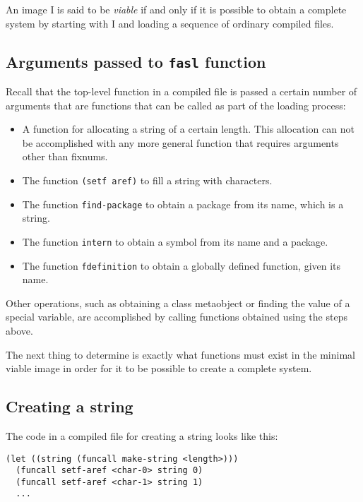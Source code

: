 An image I is said to be \emph{viable} if and only if it is possible
to obtain a complete \commonlisp{} system by starting with I and loading a
sequence of ordinary compiled files.

\subsection{Arguments passed to \texttt{fasl} function}
\label{sec-bootstrapping-arguments-to-fasl-function}

Recall that the top-level function in a compiled file is passed a
certain number of arguments that are functions that can be called as
part of the loading process:

\begin{itemize}
\item A function for allocating a string of a certain length.  This
  allocation can not be accomplished with any more general function
  that requires arguments other than fixnums.
\item The function \texttt{(setf aref)} to fill a string with
  characters.
\item The function \texttt{find-package} to obtain a package from its
  name, which is a string.
\item The function \texttt{intern} to obtain a symbol from its name
  and a package.
\item The function \texttt{fdefinition} to obtain a globally defined
  function, given its name.
\end{itemize}

Other operations, such as obtaining a class metaobject or finding the
value of a special variable, are accomplished by calling functions
obtained using the steps above.

The next thing to determine is exactly what functions must exist in
the minimal viable image in order for it to be possible to create a
complete \commonlisp{} system.

\subsection{Creating a string}
\label{sec-bootstrapping-creating-a-string}

The code in a compiled file for creating a string looks like this:

\begin{verbatim}
(let ((string (funcall make-string <length>)))
  (funcall setf-aref <char-0> string 0)
  (funcall setf-aref <char-1> string 1)
  ...
\end{verbatim}

